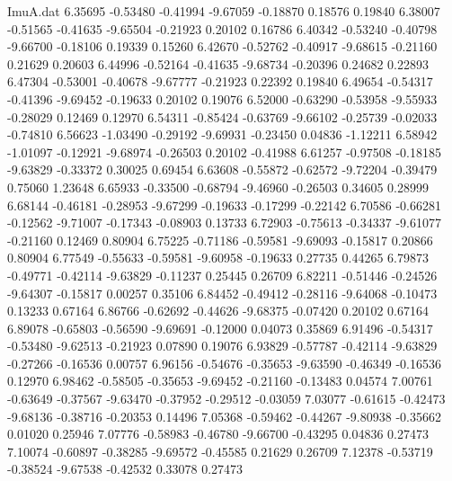 \begin{filecontents}{ImuA.dat}
   6.35695   -0.53480   -0.41994   -9.67059   -0.18870    0.18576    0.19840
   6.38007   -0.51565   -0.41635   -9.65504   -0.21923    0.20102    0.16786
   6.40342   -0.53240   -0.40798   -9.66700   -0.18106    0.19339    0.15260
   6.42670   -0.52762   -0.40917   -9.68615   -0.21160    0.21629    0.20603
   6.44996   -0.52164   -0.41635   -9.68734   -0.20396    0.24682    0.22893
   6.47304   -0.53001   -0.40678   -9.67777   -0.21923    0.22392    0.19840
   6.49654   -0.54317   -0.41396   -9.69452   -0.19633    0.20102    0.19076
   6.52000   -0.63290   -0.53958   -9.55933   -0.28029    0.12469    0.12970
   6.54311   -0.85424   -0.63769   -9.66102   -0.25739   -0.02033   -0.74810
   6.56623   -1.03490   -0.29192   -9.69931   -0.23450    0.04836   -1.12211
   6.58942   -1.01097   -0.12921   -9.68974   -0.26503    0.20102   -0.41988
   6.61257   -0.97508   -0.18185   -9.63829   -0.33372    0.30025    0.69454
   6.63608   -0.55872   -0.62572   -9.72204   -0.39479    0.75060    1.23648
   6.65933   -0.33500   -0.68794   -9.46960   -0.26503    0.34605    0.28999
   6.68144   -0.46181   -0.28953   -9.67299   -0.19633   -0.17299   -0.22142
   6.70586   -0.66281   -0.12562   -9.71007   -0.17343   -0.08903    0.13733
   6.72903   -0.75613   -0.34337   -9.61077   -0.21160    0.12469    0.80904
   6.75225   -0.71186   -0.59581   -9.69093   -0.15817    0.20866    0.80904
   6.77549   -0.55633   -0.59581   -9.60958   -0.19633    0.27735    0.44265
   6.79873   -0.49771   -0.42114   -9.63829   -0.11237    0.25445    0.26709
   6.82211   -0.51446   -0.24526   -9.64307   -0.15817    0.00257    0.35106
   6.84452   -0.49412   -0.28116   -9.64068   -0.10473    0.13233    0.67164
   6.86766   -0.62692   -0.44626   -9.68375   -0.07420    0.20102    0.67164
   6.89078   -0.65803   -0.56590   -9.69691   -0.12000    0.04073    0.35869
   6.91496   -0.54317   -0.53480   -9.62513   -0.21923    0.07890    0.19076
   6.93829   -0.57787   -0.42114   -9.63829   -0.27266   -0.16536    0.00757
   6.96156   -0.54676   -0.35653   -9.63590   -0.46349   -0.16536    0.12970
   6.98462   -0.58505   -0.35653   -9.69452   -0.21160   -0.13483    0.04574
   7.00761   -0.63649   -0.37567   -9.63470   -0.37952   -0.29512   -0.03059
   7.03077   -0.61615   -0.42473   -9.68136   -0.38716   -0.20353    0.14496
   7.05368   -0.59462   -0.44267   -9.80938   -0.35662    0.01020    0.25946
   7.07776   -0.58983   -0.46780   -9.66700   -0.43295    0.04836    0.27473
   7.10074   -0.60897   -0.38285   -9.69572   -0.45585    0.21629    0.26709
   7.12378   -0.53719   -0.38524   -9.67538   -0.42532    0.33078    0.27473

\end{filecontents}
